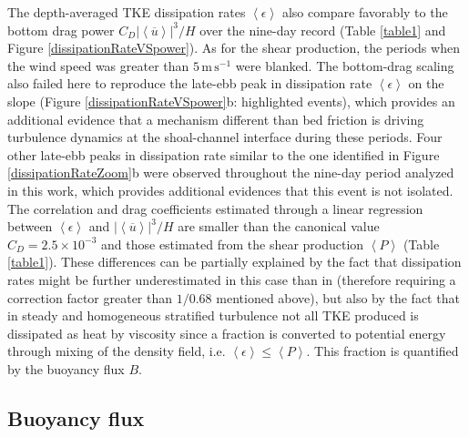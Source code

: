 The depth-averaged TKE dissipation rates $\left\langle \epsilon \right\rangle$ also compare favorably to the bottom drag power $C_D \left| \left\langle \overline{u} \right\rangle \right|^{3}/H$ over the nine-day record (Table \ref{table1} and Figure \ref{dissipationRateVSpower}). As for the shear production, the periods when the wind speed was greater than $5\, \mathrm{m \, s^{-1}}$  were blanked. The bottom-drag scaling also failed here to reproduce the late-ebb peak in dissipation rate $\left\langle \epsilon \right\rangle$ on the slope (Figure \ref{dissipationRateVSpower}b: highlighted events), which provides an additional evidence that a mechanism different than bed friction is driving turbulence dynamics at the shoal-channel interface during these periods. Four other late-ebb peaks in dissipation rate similar to the one identified in Figure \ref{dissipationRateZoom}b were observed throughout the nine-day period analyzed in this work, which provides additional evidences that this event is not isolated. The correlation and drag coefficients estimated through a linear regression between $\left\langle \epsilon \right\rangle$ and  $\left| \left\langle \overline{u} \right\rangle \right|^{3}/H$ are smaller than the canonical value $C_D=2.5\times 10^{-3}$ and those estimated from the shear production $\left\langle P \right\rangle$ (Table \ref{table1}). These differences can be partially explained by the fact that dissipation rates might be further underestimated in this case than in \textcite{Wiles:2006p5323} (therefore requiring a correction factor greater than $1/0.68$ mentioned above), but also by the fact that in steady and homogeneous stratified turbulence not all TKE produced is dissipated as heat by viscosity since a fraction is converted to potential energy through mixing of the density field, i.e. $\left\langle \epsilon \right\rangle \leq \left\langle P \right\rangle$. This fraction is quantified by the buoyancy flux $B$.


\subsection{Buoyancy flux}

